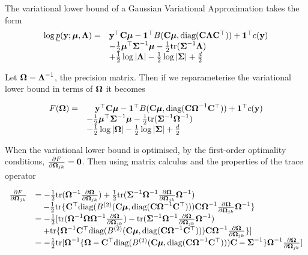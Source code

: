 The variational lower bound of a Gaussian Variational Approximation takes the form
\begin{equation}
\begin{array}{ll}
\log \underline{p}({\bf y}; {\boldsymbol \mu}, {\boldsymbol \Lambda}) =& {\bf y}^\top {\bf C} {\boldsymbol\mu} - {\bf 1}^\top B({\bf C} {\boldsymbol \mu}, \text{diag}({\bf C} {\boldsymbol \Lambda} {\bf C}^\top)) + {\bf 1}^\top c({\bf y}) \\
&- \tfrac{1}{2} {\boldsymbol \mu}^\top {\boldsymbol\Sigma}^{-1} {\boldsymbol \mu} - \tfrac{1}{2} \text{tr}({\boldsymbol \Sigma}^{-1} {\boldsymbol \Lambda}) \\
&+ \tfrac{1}{2} \log |{\boldsymbol \Lambda}| - \tfrac{1}{2} \log |{\boldsymbol \Sigma}| + \tfrac{d}{2}
\end{array}
\end{equation}

Let ${\boldsymbol \Omega} = {\boldsymbol \Lambda}^{-1}$, the precision matrix. Then if we reparameterise the variational lower bound in
terms of ${\boldsymbol \Omega}$ it becomes

\begin{equation}
\begin{array}{ll}
F({\boldsymbol \Omega}) =& \quad {\bf y}^\top {\bf C} {\boldsymbol\mu} - {\bf 1}^\top B({\bf C} {\boldsymbol \mu}, \text{diag}({\bf C} {\boldsymbol \Omega}^{-1} {\bf C}^\top)) + {\bf 1}^\top c({\bf y}) \\
&- \tfrac{1}{2} {\boldsymbol \mu}^\top {\boldsymbol\Sigma}^{-1} {\boldsymbol \mu} - \tfrac{1}{2} \text{tr}({\boldsymbol \Sigma}^{-1} {\boldsymbol \Omega}^{-1}) \\
&- \tfrac{1}{2} \log |{\boldsymbol \Omega}| - \tfrac{1}{2} \log |{\boldsymbol \Sigma}| + \tfrac{d}{2}
\end{array}
\end{equation}

When the variational lower bound is optimised, by the first-order optimality conditions, $\tfrac{\partial
F}{\partial {\boldsymbol\Omega}_{jk}} = {\bf 0}$. Then using matrix calculus and the properties of the trace operator

\begin{equation}
\begin{array}{ll}
\tfrac{\partial F}{\partial {\boldsymbol\Omega}_{jk}} &= -\tfrac{1}{2} \text{tr}({\boldsymbol \Omega}^{-1} \tfrac{\partial {\boldsymbol\Omega}}{\partial {\boldsymbol\Omega}_{jk}}) + \tfrac{1}{2} \text{tr}({\boldsymbol \Sigma}^{-1} {\boldsymbol \Omega}^{-1} \tfrac{\partial {\boldsymbol\Omega}}{\partial {\boldsymbol\Omega}_{jk}} {\boldsymbol \Omega}^{-1}) \\
&\quad -\tfrac{1}{2} \text{tr}\{{\bf C}^\top \text{diag}(B^{(2)}({\bf C} {\boldsymbol \mu}, \text{diag}({\bf C} {\boldsymbol \Omega}^{-1} {\bf C}^\top))) {\bf C} {\boldsymbol \Omega}^{-1} \tfrac{\partial {\boldsymbol\Omega}}{\partial {\boldsymbol\Omega}_{jk}} {\boldsymbol \Omega}^{-1}\} \\
&=-\tfrac{1}{2} [ \text{tr}({\boldsymbol \Omega}^{-1} {\boldsymbol \Omega} {\boldsymbol \Omega}^{-1} \tfrac{\partial {\boldsymbol\Omega}}{\partial {\boldsymbol\Omega}_{jk}}) - \text{tr}({\boldsymbol \Sigma}^{-1} {\boldsymbol \Omega}^{-1} \tfrac{\partial {\boldsymbol\Omega}}{\partial {\boldsymbol\Omega}_{jk}} {\boldsymbol \Omega}^{-1}) \\
&\quad + \text{tr}\{{\boldsymbol \Omega}^{-1} {\bf C}^\top \text{diag}(B^{(2)}({\bf C} {\boldsymbol \mu}, \text{diag}({\bf C} {\boldsymbol \Omega}^{-1} {\bf C}^\top))) {\bf C} {\boldsymbol \Omega}^{-1} \tfrac{\partial {\boldsymbol\Omega}}{\partial {\boldsymbol\Omega}_{jk}}\} ] \\
&= -\tfrac{1}{2} \text{tr}[{\boldsymbol \Omega}^{-1}\{ {\boldsymbol \Omega} - {\bf C}^\top \text{diag}(B^{(2)}({\bf C} {\boldsymbol \mu}, \text{diag}({\bf C} {\boldsymbol \Omega}^{-1} {\bf C}^\top))) {\bf C} - {\boldsymbol \Sigma}^{-1} \} {\boldsymbol \Omega}^{-1} \tfrac{\partial {\boldsymbol\Omega}}{\partial {\boldsymbol\Omega}_{jk}}]
\end{array}
\end{equation}

